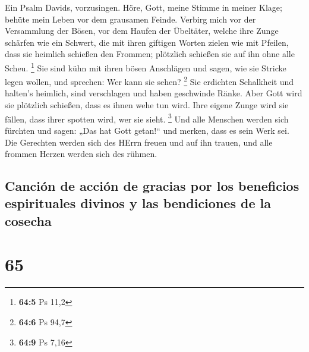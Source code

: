  Ein Psalm Davids, vorzusingen.  Höre, Gott,
meine Stimme in meiner Klage; behüte mein Leben vor dem grausamen
Feinde.  Verbirg mich vor der Versammlung der Bösen, vor
dem Haufen der Übeltäter,  welche ihre Zunge schärfen wie
ein Schwert, die mit ihren giftigen Worten zielen wie mit Pfeilen,
 dass sie heimlich schießen den Frommen; plötzlich
schießen sie auf ihn ohne alle Scheu. \footnote{\textbf{64:5} Ps 11,2}
 Sie sind kühn mit ihren bösen Anschlägen und sagen, wie
sie Stricke legen wollen, und sprechen: Wer kann sie sehen? \footnote{\textbf{64:6}
  Ps 94,7}  Sie erdichten Schalkheit und halten's
heimlich, sind verschlagen und haben geschwinde Ränke. 
Aber Gott wird sie plötzlich schießen, dass es ihnen wehe tun wird.
 Ihre eigene Zunge wird sie fällen, dass ihrer spotten
wird, wer sie sieht. \footnote{\textbf{64:9} Ps 7,16} 
Und alle Menschen werden sich fürchten und sagen: „Das hat Gott
getan!{}`` und merken, dass es sein Werk sei.  Die
Gerechten werden sich des HErrn freuen und auf ihn trauen, und alle
frommen Herzen werden sich des rühmen.

\hypertarget{canciuxf3n-de-acciuxf3n-de-gracias-por-los-beneficios-espirituales-divinos-y-las-bendiciones-de-la-cosecha}{%
\subsection{Canción de acción de gracias por los beneficios espirituales
divinos y las bendiciones de la
cosecha}\label{canciuxf3n-de-acciuxf3n-de-gracias-por-los-beneficios-espirituales-divinos-y-las-bendiciones-de-la-cosecha}}

\hypertarget{section-64}{%
\section{65}\label{section-64}}

